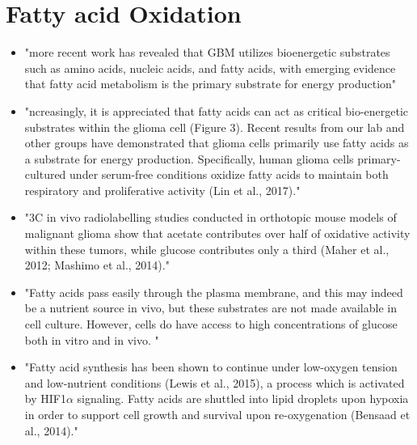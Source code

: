 \documentclass[11pt,a4paper]{article}
\begin{document}
\section{Fatty acid Oxidation}
\begin{itemize}
\item "more recent work has revealed that GBM utilizes bioenergetic substrates such as amino acids, nucleic acids, and fatty acids, with emerging evidence that fatty acid metabolism is the primary substrate for energy production"\cite{Chen2021}
\item "ncreasingly, it is appreciated that fatty acids can act as critical bio-energetic substrates within the glioma cell (Figure 3). Recent results from our lab and other groups have demonstrated that glioma cells primarily use fatty acids as a substrate for energy production. Specifically, human glioma cells primary-cultured under serum-free conditions oxidize fatty acids to maintain both respiratory and proliferative activity (Lin et al., 2017)."\cite{Strickland2017}
\item "3C in vivo radiolabelling studies conducted in orthotopic mouse models of malignant glioma show that acetate contributes over half of oxidative activity within these tumors, while glucose contributes only a third (Maher et al., 2012; Mashimo et al., 2014)." \cite{Strickland2017}
\item "Fatty acids pass easily through the plasma membrane, and this may indeed be a nutrient source in vivo, but these substrates are not made available in cell culture. However, cells do have access to high concentrations of glucose both in vitro and in vivo. "\cite{Strickland2017}
\item "Fatty acid synthesis has been shown to continue under low-oxygen tension and low-nutrient conditions (Lewis et al., 2015), a process which is activated by HIF1$\alpha$ signaling. Fatty acids are shuttled into lipid droplets upon hypoxia in order to support cell growth and survival upon re-oxygenation (Bensaad et al., 2014)."\cite{Strickland2017}
\end{itemize}
\end{document}
